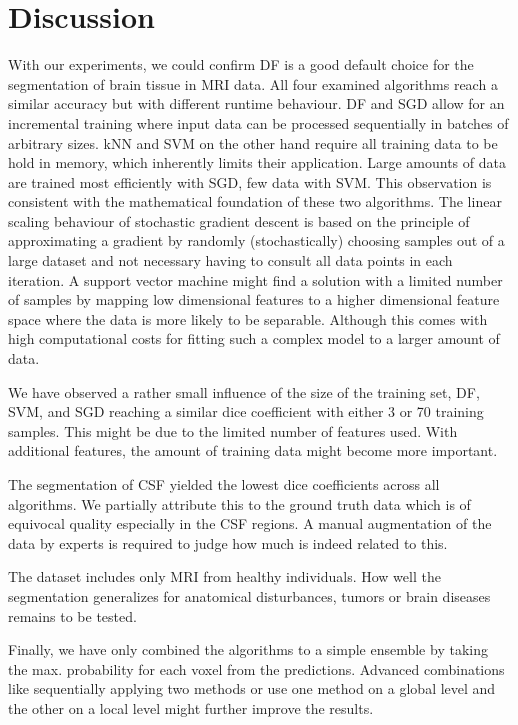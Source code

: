 \documentclass[journal]{IEEEtran}
\begin{document}
\section{Discussion}
With our experiments, we could confirm DF is a good default choice for the segmentation of brain tissue in MRI data. All four examined algorithms reach a similar accuracy but with different runtime behaviour. DF and SGD allow for an incremental training where input data can be processed sequentially in batches of arbitrary sizes. kNN and SVM on the other hand require all training data to be hold in memory, which inherently limits their application. Large amounts of data are trained most efficiently with SGD, few data with SVM. This observation is consistent with the mathematical foundation of these two algorithms. The linear scaling behaviour of stochastic gradient descent is based on the principle of approximating a gradient by randomly (stochastically) choosing samples out of a large dataset and not necessary having to consult all data points in each iteration. A support vector machine might find a solution with a limited number of samples by mapping low dimensional features to a higher dimensional feature space where the data is more likely to be separable. Although this comes with high computational costs for fitting such a complex model to a larger amount of data.

We have observed a rather small influence of the size of the training set, DF, SVM, and SGD reaching a similar dice coefficient with either 3 or 70 training samples. This might be due to the limited number of features used. With additional features, the amount of training data might become more important.

The segmentation of CSF yielded the lowest dice coefficients across all algorithms. We partially attribute this to the ground truth data which is of equivocal quality especially in the CSF regions. A manual augmentation of the data by experts is required to judge how much is indeed related to this.

The dataset includes only MRI from healthy individuals. How well the segmentation generalizes for anatomical disturbances, tumors or brain diseases remains to be tested.

Finally, we have only combined the algorithms to a simple ensemble by taking the max. probability for each voxel from the predictions. Advanced combinations like sequentially applying two methods or use one method on a global level and the other on a local level might further improve the results.
\end{document}
